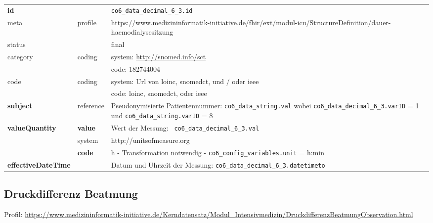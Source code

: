 \begin{longtable}{|l|l|p{7.5cm}|}
	\hline
	\rowcolor{lightgray} \multicolumn{3}{|l|}{Data Mapping (inhaltlich)} \\ \hline
	\textbf{id} &  & \texttt{co6\_data\_decimal\_6\_3.id} \\ \hline
	meta & profile & https://www.medizininformatik-initiative.de/fhir/ext/modul-icu/StructureDefinition/dauer-haemodialysesitzung \\ \hline 
	status &  & final   \\ \hline 
	category & coding & system: \url{http://snomed.info/sct} \\
	\cline{3-3}
	& & code: 182744004 \\ \hline
	code & coding & system: Url von \ac{loinc}, \ac{snomedct}, und / oder \ac{ieee} \\ 
	\cline{3-3} 
	&  & code: \ac{loinc}, \ac{snomedct}, oder \ac{ieee} \\ \hline
	\textbf{subject} & reference & Pseudonymisierte Patientennummer: \texttt{co6\_data\_string.val} wobei \texttt{co6\_data\_decimal\_6\_3.varID} = 1 und \texttt{co6\_data\_string.varID} = 8 \\ \hline
	\textbf{valueQuantity}  & \textbf{value} & Wert der Messung: \texttt{
		co6\_data\_decimal\_6\_3.val} \\
	\cline{2-3}
	& system & http://unitsofmeasure.org \\
	\cline{2-3}
	& \textbf{code} & h - Transformation notwendig - \texttt{co6\_config\_variables.unit} = h:min
	\\ \hline
	\textbf{effectiveDateTime}  & & Datum und Uhrzeit der Messung: \texttt{co6\_data\_decimal\_6\_3.datetimeto} \\
	\hline
\end{longtable}

\subsection{Druckdifferenz Beatmung} 

 Profil: \url{https://www.medizininformatik-initiative.de/Kerndatensatz/Modul_Intensivmedizin/DruckdifferenzBeatmungObservation.html}

